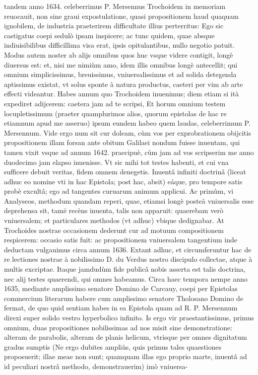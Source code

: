 \documentclass[11pt,a4paper]{article}
\begin{document}
tandem anno 1634. celeberrimus P. Mersennus Trochoidem in memoriam reuocauit, non sine graui expostulatione, quasi propositionem haud quaquam ignobilem, de industria praeterirem difficultate illius perterritus: Ego sic castigatus coepi sedulò ipsam inspicere; ac tunc quidem, quae absque indiuisibilibus difficillima visa erat, ipsis opitulantibus, nullo negotio patuit. Modus autem noster ab alijs omnibus quos huc vsque videre contigit, longè diuersus est: et, nisi me nimiùm amo, idem illis omnibus longè antecellit; qui omnium simplicissimus, breuissimus, vniuersalissimus et ad solida detegenda aptissimus existat, vt solus sponte à natura productus, caeteri per vim ab arte effecti videantur. Habes annum quo Trochoidem inuenimus; diem etiam si ità expediret adijcerem: caetera jam ad te scripsi, Et horum omnium testem locupletissimum (praeter quamplurimos alios, quorum epistolas de hac re etiamnum apud me asseruo) ipsum eundem habeo quem laudas, celeberrimum P. Mersennum. Vide ergo num sit cur doleam, cùm vos per exprobrationem obijcitis propositionem illam forsan ante obitum Galilaei nondum fuisse inuentam, qui tamen vixit vsque ad annum 1642. praecipuè, cùm jam ad vos scripserim me anno duodecimo jam elapso inuenisse. Vt sic mihi tot testes habenti, et cui vna sufficere debuit veritas, fidem omnem denegetis. Inuentâ infiniti doctrinâ (liceat adhuc eo nomine vti in hac Epistola; post hac, absit) eáque, pro tempore satis probè excultâ; ego ad tangentes curuarum animum applicui. Ac primùm, vi Analyseos, methodum quandam reperi, quae, etiamsi longè posteà vniuersalis esse deprehensa sit, tamē recèns inuenta, talis non apparuit: quaerebam verò vniuersalem; et particulares methodos (vt adhuc) vbique dedignabar. At Trochoides nostrae occasionem dederunt cur ad motuum compositionem respicerem: occasio satis fuit: ac propositionem vniuersalem tangentium inde deductam vulgauimus circa annum 1636. Extant adhuc, et circumferuntur hac de re lectiones nostrae à nobilissimo D. du Verdus nostro discipulo collectae, atque à multis excriptae. Itaque jamdudùm fide publicâ nobis asserta est talis doctrina, nec alij testes quaerendi, qui omnes habeamus. Circa haec tempora nempe anno 1635, mediante amplissimo senatore Domino de Carcauy, coepi per Epistolas commercium literarum habere cum amplissimo senatore Tholosano Domino de fermat, de quo quid sentiam habes in ea Epistola quam ad R. P. Mersennum direxi super solido vestro hyperbolico infinito. Is ergo vir praestantissimus, primus omnium, duas propositiones nobilissimas ad nos misit sine demonstratione: alteram de parabolis, alteram de planis helicum, vtrisque per omnes dignitatum gradus sumptis (Ne ergo dubites ampliùs, quis primus tales quaestiones proposuerit; illae meae non sunt; quamquam illas ego proprio marte, inuentâ ad id peculiari nostrâ methodo, demonstrauerim) imò vniuersa-
\end{document}
